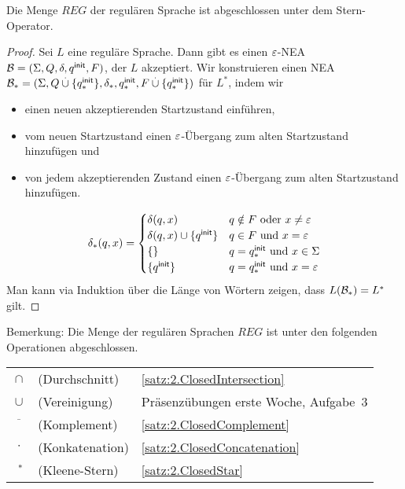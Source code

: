 {\begin{lemma}\label{satz:2.ClosedStar}
Die Menge $REG$ der regulären Sprache ist abgeschlossen unter dem Stern-Operator.
\end{lemma}

\begin{proof}
Sei $L$ eine reguläre Sprache. Dann gibt es einen $\varepsilon$-NEA $\mathcal{B}=(\Sigma, Q, \delta, q^\mathsf{init}, F)$, der $L$ akzeptiert. 
Wir konstruieren einen NEA $\mathcal{B}_*=(\Sigma, Q\overset.\cup\{q^\mathsf{init}_*\}, \delta_*, q^\mathsf{init}_*, F\overset.\cup\{q^\mathsf{init}_*\})$ für $L^*$, indem wir
\begin{itemize}
 \item einen neuen akzeptierenden Startzustand einführen,
 \item vom neuen Startzustand einen $\varepsilon$-Übergang zum alten Startzustand hinzufügen und
 \item von jedem akzeptierenden Zustand einen $\varepsilon$-Übergang zum alten Startzustand hinzufügen.
\end{itemize}
\[
                \delta_*(q,x) =
                        \begin{cases}
                                \delta(q,x) & q\notin F \text{ oder } x \neq \varepsilon\\
                                \delta(q,x)\cup\{q^\mathsf{init}\} & q\in F \text{ und } x = \varepsilon \\
                                \{\} & q=q^\mathsf{init}_* \text{ und } x \in\Sigma\\
                                \{q^\mathsf{init}\} & q=q^\mathsf{init}_* \text{ und } x = \varepsilon
                        \end{cases}
\]
Man kann via Induktion über die Länge von Wörtern zeigen, dass $L(\mathcal{B}_*)=L^*$ gilt.
\end{proof}

Bemerkung: Die Menge der regulären Sprachen $REG$ ist unter den folgenden Operationen abgeschlossen.

\begin{center}
\begin{tabular}{cl@{\quad}l}
 $\cap$ & (Durchschnitt) & \autoref{satz:2.ClosedIntersection}\\
 $\cup$ & (Vereinigung) & Präsenzübungen erste Woche, Aufgabe~3\\
 $\overline{\phantom{X}}$ & (Komplement) & \autoref{satz:2.ClosedComplement}\\
 $\cdot$ & (Konkatenation) & \autoref{satz:2.ClosedConcatenation}\\
 $\phantom{\cdot}^*$ & (Kleene-Stern) & \autoref{satz:2.ClosedStar} 
\end{tabular}
\end{center}



}
